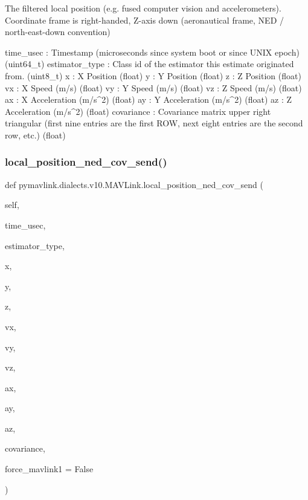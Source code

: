 \begin{DoxyVerb}
\begin{DoxyVerb}
\begin{DoxyVerb}
\begin{DoxyVerb}
\begin{DoxyVerb}The filtered local position (e.g. fused computer vision and
accelerometers). Coordinate frame is right-handed,
Z-axis down (aeronautical frame, NED / north-east-down
convention)

time_usec                 : Timestamp (microseconds since system boot or since UNIX epoch) (uint64_t)
estimator_type            : Class id of the estimator this estimate originated from. (uint8_t)
x                         : X Position (float)
y                         : Y Position (float)
z                         : Z Position (float)
vx                        : X Speed (m/s) (float)
vy                        : Y Speed (m/s) (float)
vz                        : Z Speed (m/s) (float)
ax                        : X Acceleration (m/s^2) (float)
ay                        : Y Acceleration (m/s^2) (float)
az                        : Z Acceleration (m/s^2) (float)
covariance                : Covariance matrix upper right triangular (first nine entries are the first ROW, next eight entries are the second row, etc.) (float)\end{DoxyVerb}
 \mbox{\label{classpymavlink_1_1dialects_1_1v10_1_1MAVLink_ac5886ff0ee904217db62e0554f14f9fc}} 
\subsubsection{\texorpdfstring{local\+\_\+position\+\_\+ned\+\_\+cov\+\_\+send()}{local\_position\_ned\_cov\_send()}}
{\footnotesize\ttfamily def pymavlink.\+dialects.\+v10.\+M\+A\+V\+Link.\+local\+\_\+position\+\_\+ned\+\_\+cov\+\_\+send (\begin{DoxyParamCaption}\item[{}]{self,  }\item[{}]{time\+\_\+usec,  }\item[{}]{estimator\+\_\+type,  }\item[{}]{x,  }\item[{}]{y,  }\item[{}]{z,  }\item[{}]{vx,  }\item[{}]{vy,  }\item[{}]{vz,  }\item[{}]{ax,  }\item[{}]{ay,  }\item[{}]{az,  }\item[{}]{covariance,  }\item[{}]{force\+\_\+mavlink1 = {\ttfamily False} }\end{DoxyParamCaption})}


\end{DoxyVerb}
\end{DoxyVerb}
\end{DoxyVerb}
\end{DoxyVerb}
